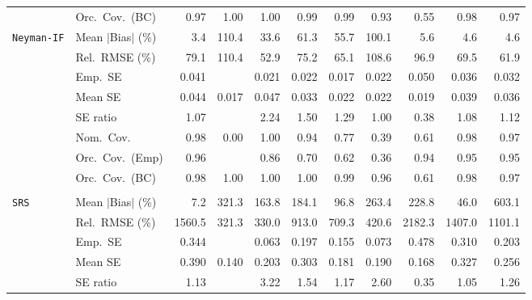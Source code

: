 \begin{landscape}
\begin{longtable}{llrrrrrrrrr}
 & Orc.\ Cov.\ (BC) & \cellcolor{rankone}0.97 & 1.00 & 1.00 & \cellcolor{rankthree}0.99 & \cellcolor{rankthree}0.99 & \cellcolor{rankone}0.93 & 0.55 & \cellcolor{ranktwo}0.98 & \cellcolor{rankone}0.97 \\
\addlinespace[2pt]
\quad \texttt{Neyman-IF} & Mean $|$Bias$|$ (\%) & \cellcolor{rankone}3.4 & 110.4 & 33.6 & 61.3 & 55.7 & 100.1 & \cellcolor{rankthree}5.6 & \cellcolor{ranktwo}4.6 & \cellcolor{ranktwo}4.6 \\
 & Rel.\ RMSE (\%) & 79.1 & 110.4 & \cellcolor{rankone}52.9 & 75.2 & \cellcolor{rankthree}65.1 & 108.6 & 96.9 & 69.5 & \cellcolor{ranktwo}61.9 \\
 & Emp.\ SE & 0.041 &  & 0.021 & 0.022 & 0.017 & 0.022 & 0.050 & 0.036 & 0.032 \\
 & Mean SE & 0.044 & 0.017 & 0.047 & 0.033 & 0.022 & 0.022 & 0.019 & 0.039 & 0.036 \\
 & SE ratio & \cellcolor{ranktwo}1.07 &  & 2.24 & 1.50 & 1.29 & \cellcolor{rankone}1.00 & 0.38 & \cellcolor{rankthree}1.08 & 1.12 \\
 & Nom.\ Cov. & \cellcolor{rankthree}0.98 & 0.00 & 1.00 & \cellcolor{rankone}0.94 & 0.77 & 0.39 & 0.61 & \cellcolor{rankthree}0.98 & \cellcolor{ranktwo}0.97 \\
 & Orc.\ Cov.\ (Emp) & \cellcolor{ranktwo}0.96 &  & \cellcolor{rankthree}0.86 & 0.70 & 0.62 & 0.36 & \cellcolor{ranktwo}0.94 & \cellcolor{rankone}0.95 & \cellcolor{rankone}0.95 \\
 & Orc.\ Cov.\ (BC) & \cellcolor{rankthree}0.98 & 1.00 & 1.00 & 1.00 & 0.99 & \cellcolor{rankone}0.96 & 0.61 & \cellcolor{rankthree}0.98 & \cellcolor{ranktwo}0.97 \\
\addlinespace[2pt]
\multicolumn{11}{l}{\textbf{Binary \& Categorical Phase-One Covariates}} \\
\addlinespace[2pt]
\quad \texttt{SRS} & Mean $|$Bias$|$ (\%) & \cellcolor{rankone}7.2 & 321.3 & 163.8 & 184.1 & \cellcolor{rankthree}96.8 & 263.4 & 228.8 & \cellcolor{ranktwo}46.0 & 603.1 \\
 & Rel.\ RMSE (\%) & 1560.5 & \cellcolor{rankone}321.3 & \cellcolor{ranktwo}330.0 & 913.0 & 709.3 & \cellcolor{rankthree}420.6 & 2182.3 & 1407.0 & 1101.1 \\
 & Emp.\ SE & 0.344 &  & 0.063 & 0.197 & 0.155 & 0.073 & 0.478 & 0.310 & 0.203 \\
 & Mean SE & 0.390 & 0.140 & 0.203 & 0.303 & 0.181 & 0.190 & 0.168 & 0.327 & 0.256 \\
 & SE ratio & \cellcolor{ranktwo}1.13 &  & 3.22 & 1.54 & \cellcolor{rankthree}1.17 & 2.60 & 0.35 & \cellcolor{rankone}1.05 & 1.26 \\

\end{longtable}
\end{landscape}
